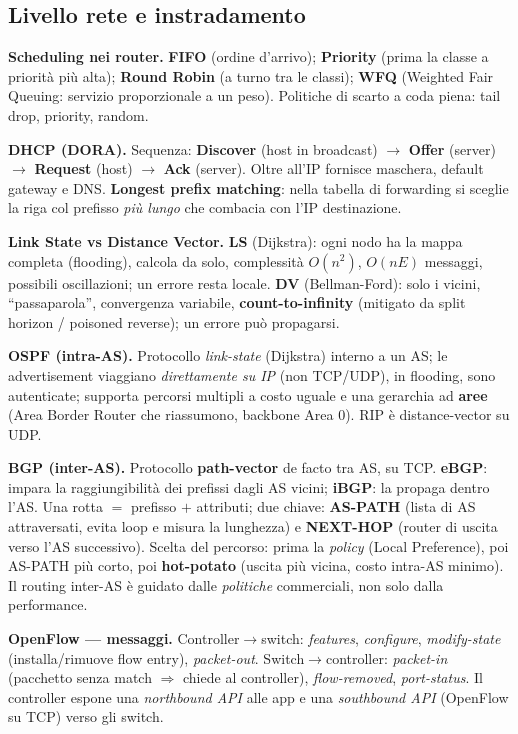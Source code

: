 \documentclass[11pt,a4paper]{report}
\begin{document}
\subsection*{Livello rete e instradamento}
\textbf{Scheduling nei router.} \textbf{FIFO} (ordine d'arrivo); \textbf{Priority}
(prima la classe a priorità più alta); \textbf{Round Robin} (a turno tra le
classi); \textbf{WFQ} (Weighted Fair Queuing: servizio proporzionale a un peso).
Politiche di scarto a coda piena: tail drop, priority, random.

\textbf{DHCP (DORA).} Sequenza: \textbf{Discover} (host in broadcast)
$\to$ \textbf{Offer} (server) $\to$ \textbf{Request} (host) $\to$ \textbf{Ack}
(server). Oltre all'IP fornisce maschera, default gateway e DNS. \textbf{Longest
prefix matching}: nella tabella di forwarding si sceglie la riga col prefisso
\emph{più lungo} che combacia con l'IP destinazione.

\textbf{Link State vs Distance Vector.} \textbf{LS} (Dijkstra): ogni nodo ha la
mappa completa (flooding), calcola da solo, complessità $O(n^2)$, $O(nE)$
messaggi, possibili oscillazioni; un errore resta locale. \textbf{DV}
(Bellman-Ford): solo i vicini, ``passaparola'', convergenza variabile,
\textbf{count-to-infinity} (mitigato da split horizon / poisoned reverse); un
errore può propagarsi.

\textbf{OSPF (intra-AS).} Protocollo \emph{link-state} (Dijkstra) interno a un AS;
le advertisement viaggiano \emph{direttamente su IP} (non TCP/UDP), in flooding,
sono autenticate; supporta percorsi multipli a costo uguale e una gerarchia ad
\textbf{aree} (Area Border Router che riassumono, backbone Area 0). RIP è
distance-vector su UDP.

\textbf{BGP (inter-AS).} Protocollo \textbf{path-vector} de facto tra AS, su TCP.
\textbf{eBGP}: impara la raggiungibilità dei prefissi dagli AS vicini;
\textbf{iBGP}: la propaga dentro l'AS. Una rotta $=$ prefisso $+$ attributi; due
chiave: \textbf{AS-PATH} (lista di AS attraversati, evita loop e misura la
lunghezza) e \textbf{NEXT-HOP} (router di uscita verso l'AS successivo). Scelta
del percorso: prima la \emph{policy} (Local Preference), poi AS-PATH più corto,
poi \textbf{hot-potato} (uscita più vicina, costo intra-AS minimo). Il routing
inter-AS è guidato dalle \emph{politiche} commerciali, non solo dalla performance.

\textbf{OpenFlow --- messaggi.} Controller$\to$switch: \emph{features},
\emph{configure}, \emph{modify-state} (installa/rimuove flow entry),
\emph{packet-out}. Switch$\to$controller: \emph{packet-in} (pacchetto senza match
$\Rightarrow$ chiede al controller), \emph{flow-removed}, \emph{port-status}.
Il controller espone una \emph{northbound API} alle app e una \emph{southbound API}
(OpenFlow su TCP) verso gli switch.
\end{document}
